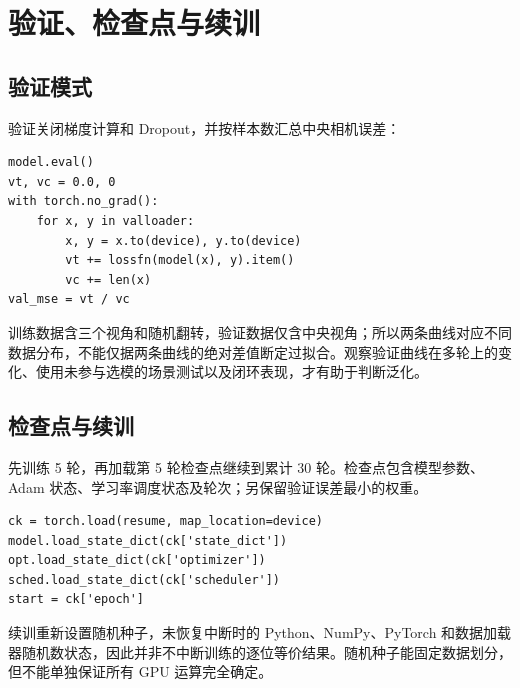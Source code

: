 \documentclass[UTF8,zihao=-4,fontset=windows]{ctexart}
\begin{document}
\section{验证、检查点与续训}
\subsection{验证模式}
验证关闭梯度计算和 Dropout，并按样本数汇总中央相机误差：
\begin{lstlisting}
model.eval()
vt, vc = 0.0, 0
with torch.no_grad():
    for x, y in valloader:
        x, y = x.to(device), y.to(device)
        vt += lossfn(model(x), y).item()
        vc += len(x)
val_mse = vt / vc
\end{lstlisting}
训练数据含三个视角和随机翻转，验证数据仅含中央视角；所以两条曲线对应不同数据分布，不能仅据两条曲线的绝对差值断定过拟合。观察验证曲线在多轮上的变化、使用未参与选模的场景测试以及闭环表现，才有助于判断泛化。
\subsection{检查点与续训}
先训练 5 轮，再加载第 5 轮检查点继续到累计 30 轮。检查点包含模型参数、Adam 状态、学习率调度状态及轮次；另保留验证误差最小的权重。
\begin{lstlisting}
ck = torch.load(resume, map_location=device)
model.load_state_dict(ck['state_dict'])
opt.load_state_dict(ck['optimizer'])
sched.load_state_dict(ck['scheduler'])
start = ck['epoch']
\end{lstlisting}
续训重新设置随机种子，未恢复中断时的 Python、NumPy、PyTorch 和数据加载器随机数状态，因此并非不中断训练的逐位等价结果。随机种子能固定数据划分，但不能单独保证所有 GPU 运算完全确定。
\newpage
\end{document}

